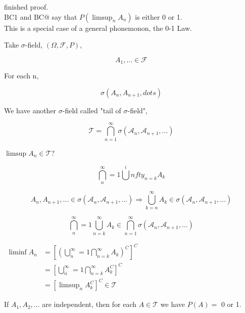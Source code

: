 \documentclass[11pt,fleqn]{book} %
\begin{document}
finished proof. \\

BC1 and BC@ say that  $P \left(\limsup_n A_n \right)$ is either 0 or 1.\\

This is a special case of a general phonemonon, the 0-1 Law.

Take $\sigma$-field, $(\Omega, \mathscr{F}, P)$, 

$$A_1, \dots \in \mathscr{F} $$

For each n, 

$$\sigma(A_n, A_{n+1}, dots) $$

We have another $\sigma$-field called "tail of $\sigma$-field",

$$\mathscr{T} =  \bigcap^\infty_{n=1} \sigma(\mathscr{A}_n, \mathscr{A}_{n+1}, \dots) $$

\begin{example}[4.18 in Billingsly]
	$\limsup A_n \in \mathscr{T}$?

		$$\bigcap^\infty_n=1 \bigcup^infty_{n=k}  A_k  $$

		$$ A_n, A_{n+1}, \dots \in \sigma(\mathscr{A}_n, \mathscr{A}_{n+1}, \dots) \Rightarrow \bigcup^\infty_{k=n} A_k \in \sigma(\mathscr{A}_n, \mathscr{A}_{n+1}, \dots)$$

		$$\bigcap^\infty_n=1 \bigcup^\infty_{n=k}  A_k \in \bigcap^\infty_{n=1} \sigma(\mathscr{A}_n, \mathscr{A}_{n+1}, \dots) $$

	$\begin{aligned}
		\liminf A_n &= \left[ (\bigcup^\infty_n=1 \bigcap^\infty_{n=k}  A_k )^C \right]^C\\
			&= \left[ \bigcup^\infty_n=1 \bigcap^\infty_{n=k}  A_k^C \right]^C\\
			&= \left[\limsup_n A_k^C \right]^C \in \mathscr{T}
	\end{aligned}
	$


\end{example}



\begin{theorem}
	If $A_1, A_2, \dots$ are independent, then for each $A \in \mathscr{T}$ we have $P(A) = $ 0 or 1.
\end{theorem}
\end{document}
